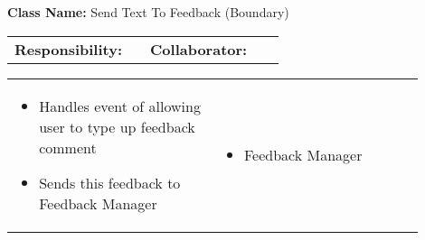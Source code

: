 \begin{red_cards}[]
    \textbf{Class Name:} Send Text To Feedback (Boundary)
    \tcbline
    \begin{tabular}{p{0.45\linewidth} | p{0.45\linewidth}}
        \textbf{Responsibility:}& 
        \textbf{Collaborator:}\\
    \end{tabular}
    \tcbline
    \begin{tabular}{p{0.45\linewidth} | p{0.45\linewidth}}
        \begin{itemize}
            \item Handles event of allowing user to type up feedback comment
            \item Sends this feedback to Feedback Manager
        \end{itemize}
        &
        \begin{itemize}
            \item Feedback Manager
        \end{itemize}
    \end{tabular}
\end{red_cards}